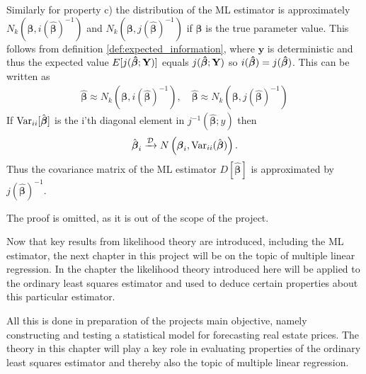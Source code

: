 Similarly for property c) the distribution of the ML estimator is approximately $N_k(\boldsymbol{\beta}, i(\hat{\boldsymbol{\beta}})^{-1})$ and $N_k(\boldsymbol{\beta}, j(\hat{\boldsymbol{\beta}})^{-1})$ if $\boldsymbol{\beta}$ is the true parameter value. This follows from definition \ref{def:expected_information}, where $\textbf{y}$ is deterministic and thus the expected value $E[j(\operatorname{\boldsymbol{\hat{\beta}}} ; \textbf{Y})]$ equals $j(\operatorname{\boldsymbol{\hat{\beta}}}; \textbf{Y})$ so $i(\operatorname{\boldsymbol{\hat{\beta}}}) = j(\operatorname{\boldsymbol{\hat{\beta}}})$. This can be written as
\begin{align*}
    \hat{\boldsymbol{\beta}} \approx N_k(\boldsymbol{\beta}, i(\hat{\boldsymbol{\beta}})^{-1}), \quad \hat{\boldsymbol{\beta}} \approx N_k(\boldsymbol{\beta}, j(\hat{\boldsymbol{\beta}})^{-1})
\end{align*}
If $\operatorname{\text{Var}}_{ii}[\hat{\boldsymbol{\beta}}]$ is the i'th diagonal element in $j^{-1}(\hat{\boldsymbol{\beta}};y)$ then
\begin{align*}
    \hat{\boldsymbol{\beta}}_i \xrightarrow{\mathcal{D}} N\left( \boldsymbol{\beta}_i, \operatorname{\text{Var}}_{ii}(\hat{\boldsymbol{\beta}}) \right).
\end{align*}
Thus the covariance matrix of the ML estimator $D[\hat{\boldsymbol{\beta}}]$ is approximated by $j(\hat{\boldsymbol{\beta}})^{-1}$.

The proof is omitted, as it is out of the scope of the project. 

Now that key results from likelihood theory are introduced, including the ML estimator, the next chapter in this project will be on the topic of multiple linear regression.
In the chapter the likelihood theory introduced here will be applied to the ordinary least squares estimator and used to deduce certain properties about this particular estimator.

All this is done in preparation of the projects main objective, namely constructing and testing a statistical model for forecasting real estate prices.
The theory in this chapter will play a key role in evaluating properties of the ordinary least squares estimator and thereby also the topic of multiple linear regression.
